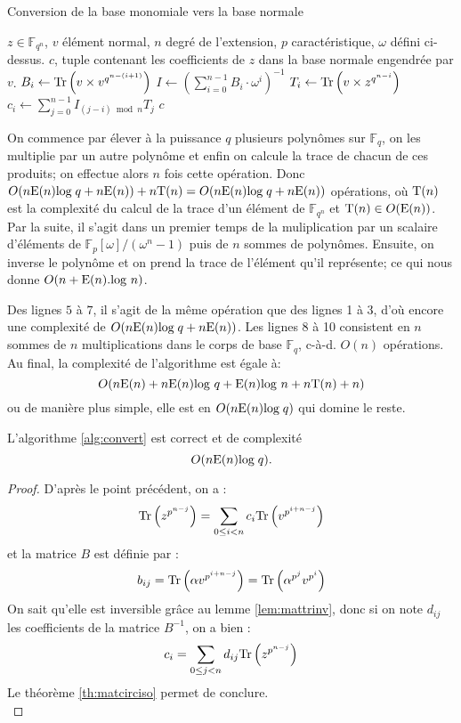 \documentclass[a4paper]{article} %
\numberwithin{section}{part}
\numberwithin{equation}{section}
\newcommand\GF[1]{\mathbb{F}_{#1}}
\newcommand\Tr[1]{\textup{Tr}\left(#1\right)}
\newcommand\E[1]{\textup{E}(#1)}
\begin{document}
\begin{algorithm}
\caption{Conversion de la base monomiale vers la base normale}
\label{alg:convert}
\begin{algorithmic}[1]
\REQUIRE $z\in\GF{q^n}$, $v$ élément normal, $n$ degré de l'extension, $p$ 
caractéristique, $\omega$ défini ci-dessus.
\ENSURE $c$, tuple contenant les coefficients de $z$ dans la base 
normale engendrée par $v$.
\bigskip
{}
    \STATE $B_i \leftarrow \Tr{v\times v^{q^{n-(i+1)}}}$
\ENDFOR
\STATE $I \leftarrow (\sum_{i = 0}^{n-1}{B_i\cdot \omega^i})^{-1}$
    \STATE $T_i \leftarrow \Tr{v\times z^{q^{n-i}}}$
\ENDFOR
{}
    \STATE $c_i \leftarrow \sum_{j=0}^{n-1}{I_{(j-i)\bmod n}T_j}$
\ENDFOR
\RETURN $c$

\end{algorithmic}
\end{algorithm}
On commence par élever à la puissance $q$ plusieurs polynômes sur $\GF{q}$, 
on les multiplie par un autre polynôme et enfin on calcule la trace de chacun 
de ces produits; on effectue alors $n$ fois cette opération. Donc 
$O(n\E{n}\textup{log}\;q + n\E{n}) + n\textup{T}(n) = O(n\E{n}\textup{log}\;q + 
n\E{n})$ opérations, 
où $\textup{T}(n)$ est la complexité du calcul de la trace d'un élément
de $\GF{q^n}$ et $\textup{T}(n) \in O(\E{n})$.
Par la suite, il s'agit dans un premier temps de la muliplication par un 
scalaire d'éléments de $\mathbb{F}_p[\omega]/(\omega^n - 1)$ puis de $n$ sommes 
de polynômes. Ensuite, on inverse le polynôme et on prend la trace de l'élément 
qu'il représente; ce qui nous donne $O(n + \E{n}.\textup{log }n)$.\par
Des lignes $5$ à $7$, il s'agit de la même opération que des lignes 1 à 3, d'où 
encore une complexité de $O(n\E{n}\textup{log}\;q + n\E{n})$.
Les lignes 8 à 10 consistent en $n$ sommes de $n$ multiplications dans le corps 
de base $\GF{q}$, c-à-d. $O(n)$ opérations.
Au final, la complexité de l'algorithme est égale à:
\[O(n\E{n} + n\E{n}\textup{log }q +  \E{n}\textup{log }n + n\textup{T}(n) + n)\]
ou de manière plus simple, elle est en $O(n\E{n}\textup{log}\;q)$ qui domine le 
reste.

\begin{prop}
\label{prop:algconvert}
L'algorithme \ref{alg:convert} est correct et de complexité
\begin{equation}
O(n\E{n}\textup{log}\;q).
\end{equation}
\end{prop}
\begin{proof}
D'après le point précédent, on a :
\[\textup{Tr}\left(z^{p^{n-j}}\right) = \sum_{0\leq i < n}{c_i\textup{Tr}
\left(v^{p^{i+n-j}}\right)}\]
et la matrice $B$ est définie par :
\[b_{ij} = \Tr{\alpha v^{p^{i+n-j}}} = \Tr{\alpha^{p^j}v^{p^i}}\]
On sait qu'elle est inversible grâce au lemme \ref{lem:mattrinv}, donc si on
note $d_{ij}$ les coefficients de la matrice $B^{-1}$, on a bien :
\[c_i = \sum_{0\leq j < n}{d_{ij}\textup{Tr}\left(z^{p^{n-j}}\right)}\]
Le théorème \ref{th:matcirciso} permet de conclure.\\
\end{proof}
\end{document}
